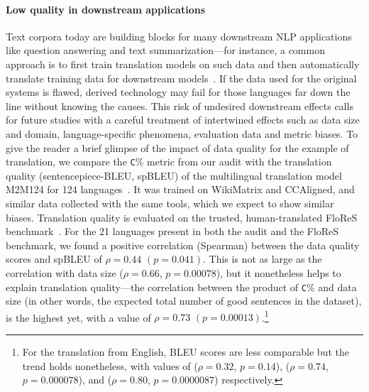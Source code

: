 \paragraph{Low quality in downstream applications}
Text corpora today are building blocks for many downstream NLP applications like question answering and text summarization---for instance, a common approach is to first train translation models on such data and then automatically translate training data for downstream models~\citep{conneau-etal-2018-xnli}. If the data used for the original systems is flawed, derived technology may fail for those languages far down the line without knowing the causes.
This risk of undesired downstream effects calls for future studies with a careful treatment of intertwined effects such as data size and domain, language-specific phenomena, evaluation data and metric biases.
To give the reader a brief glimpse of the impact of data quality for the example of translation, we compare the \texttt{C}\% metric from our audit with the translation quality (sentencepiece-BLEU, spBLEU) of the multilingual translation model M2M124 for 124 languages~\citep{goyal-etal-2021-flores-101}. It was trained on WikiMatrix and CCAligned, and similar data collected with the same tools, which we expect to show similar biases. Translation quality is evaluated on the trusted, human-translated FloReS benchmark~\citep{goyal-etal-2021-flores-101}.
For the 21 languages present in both the audit and the FloReS benchmark, we found a positive correlation (Spearman) between the data quality scores and spBLEU of $\rho=0.44$ $(p=0.041)$. This is not as large as the correlation with data size ($\rho=0.66$, $p=0.00078$), but it nonetheless helps to explain translation quality---the correlation between the product of \texttt{C}\% and data size (in other words, the expected total number of good sentences in the dataset), is the highest yet, with a value of $\rho=0.73$ $(p=0.00013)$.\footnote{For the translation from English, BLEU scores are less comparable but the trend holds nonetheless, with values of ($\rho=0.32$, $p=0.14$), ($\rho=0.74$, $p=0.000078$), and ($\rho=0.80$, $p=0.0000087$) respectively.}

